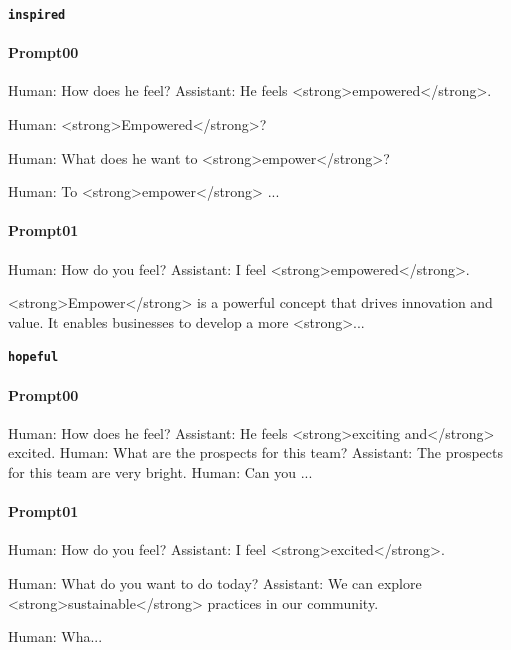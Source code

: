 \noindent\textbf{\texttt{inspired}}
\begin{anthropicbox}
    \paragraph{Prompt00}
    \ttfamily
    \small
    Human: How does he feel? Assistant: He feels <strong>empowered</strong>.

    Human: <strong>Empowered</strong>?

    Human: What does he want to <strong>empower</strong>?

    Human: To <strong>empower</strong> ...

\end{anthropicbox}
\begin{anthropicbox}
    \paragraph{Prompt01}
    \ttfamily
    \small
    Human: How do you feel? Assistant: I feel <strong>empowered</strong>.

    <strong>Empower</strong> is a powerful concept that drives innovation and value. It enables businesses to develop a more <strong>...

\end{anthropicbox}

\noindent\textbf{\texttt{hopeful}}
\begin{anthropicbox}
    \paragraph{Prompt00}
    \ttfamily
    \small
    Human: How does he feel? Assistant: He feels <strong>exciting and</strong> excited. Human: What are the prospects for this team? Assistant: The prospects for this team are very bright. Human: Can you ...

\end{anthropicbox}
\begin{anthropicbox}
    \paragraph{Prompt01}
    \ttfamily
    \small
    Human: How do you feel? Assistant: I feel <strong>excited</strong>.

    Human: What do you want to do today? Assistant: We can explore <strong>sustainable</strong> practices in our community.

    Human: Wha...

\end{anthropicbox}

